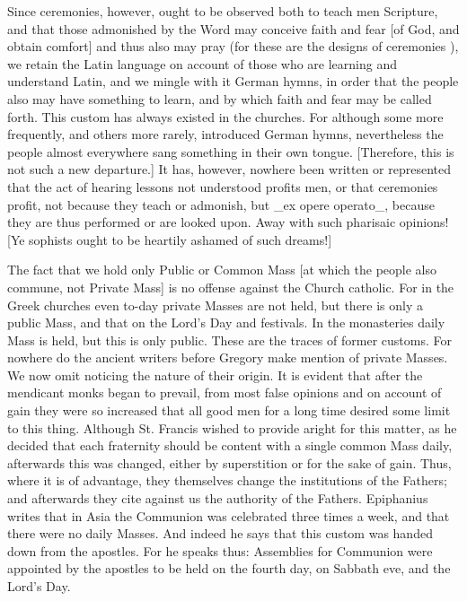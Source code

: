 Since ceremonies, however, ought to be observed both to teach men
Scripture, and that those admonished by the Word may conceive faith
and fear [of God, and obtain comfort] and thus also may pray (for
these are the designs of ceremonies ), we retain the Latin language
on account of those who are learning and understand Latin, and we
mingle with it German hymns, in order that the people also may have
something to learn, and by which faith and fear may be called forth.
This custom has always existed in the churches.  For although some
more frequently, and others more rarely, introduced German hymns,
nevertheless the people almost everywhere sang something in their own
tongue.  [Therefore, this is not such a new departure.] It has,
however, nowhere been written or represented that the act of hearing
lessons not understood profits men, or that ceremonies profit, not
because they teach or admonish, but _ex opere operato_, because they
are thus performed or are looked upon.  Away with such pharisaic
opinions!  [Ye sophists ought to be heartily ashamed of such dreams!]

The fact that we hold only Public or Common Mass [at which the people
also commune, not Private Mass] is no offense against the Church
catholic.  For in the Greek churches even to-day private Masses are
not held, but there is only a public Mass, and that on the Lord's Day
and festivals.  In the monasteries daily Mass is held, but this is
only public.  These are the traces of former customs.  For nowhere do
the ancient writers before Gregory make mention of private Masses.
We now omit noticing the nature of their origin.  It is evident that
after the mendicant monks began to prevail, from most false opinions
and on account of gain they were so increased that all good men for a
long time desired some limit to this thing.  Although St. Francis
wished to provide aright for this matter, as he decided that each
fraternity should be content with a single common Mass daily,
afterwards this was changed, either by superstition or for the sake
of gain.  Thus, where it is of advantage, they themselves change the
institutions of the Fathers; and afterwards they cite against us the
authority of the Fathers.  Epiphanius writes that in Asia the
Communion was celebrated three times a week, and that there were no
daily Masses.  And indeed he says that this custom was handed down
from the apostles.  For he speaks thus: Assemblies for Communion were
appointed by the apostles to be held on the fourth day, on Sabbath
eve, and the Lord's Day.

